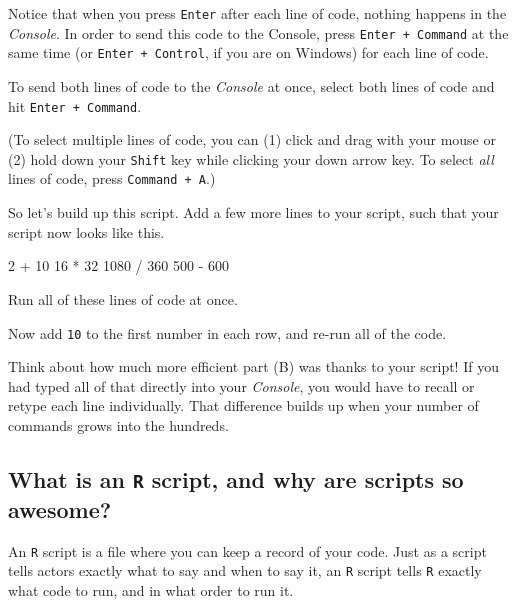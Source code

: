 \documentclass[
]{book}
\newenvironment{Shaded}{\begin{snugshade}}{\end{snugshade}}
\newcommand{\DecValTok}[1]{\textcolor[rgb]{0.00,0.00,0.81}{#1}}
\newcommand{\SpecialCharTok}[1]{\textcolor[rgb]{0.00,0.00,0.00}{#1}}
\begin{document}
Notice that when you press \texttt{Enter} after each line of code, nothing happens in the \emph{Console}. In order to send this code to the Console, press \texttt{Enter\ +\ Command} at the same time (or \texttt{Enter\ +\ Control}, if you are on Windows) for each line of code.

To send both lines of code to the \emph{Console} at once, select both lines of code and hit \texttt{Enter\ +\ Command}.

(To select multiple lines of code, you can (1) click and drag with your mouse or (2) hold down your \texttt{Shift} key while clicking your down arrow key. To select \emph{all} lines of code, press \texttt{Command\ +\ A}.)

So let's build up this script. Add a few more lines to your script, such that your script now looks like this.

\begin{Shaded}
\begin{Highlighting}[]
\DecValTok{2}  \SpecialCharTok{+} \DecValTok{10}
\DecValTok{16} \SpecialCharTok{*} \DecValTok{32}
\DecValTok{1080} \SpecialCharTok{/} \DecValTok{360}
\DecValTok{500} \SpecialCharTok{{-}} \DecValTok{600}
\end{Highlighting}
\end{Shaded}

Run all of these lines of code at once.

Now add \texttt{10} to the first number in each row, and re-run all of the code.

Think about how much more efficient part (B) was thanks to your script! If you had typed all of that directly into your \emph{Console}, you would have to recall or retype each line individually. That difference builds up when your number of commands grows into the hundreds.

\hypertarget{what-is-an-r-script-and-why-are-scripts-so-awesome}{%
\subsection*{\texorpdfstring{What is an \texttt{R} script, and why are scripts so awesome?}{What is an R script, and why are scripts so awesome?}}\label{what-is-an-r-script-and-why-are-scripts-so-awesome}}

An \texttt{R} script is a file where you can keep a record of your code. Just as a script tells actors exactly what to say and when to say it, an \texttt{R} script tells \texttt{R} exactly what code to run, and in what order to run it.
\end{document}
